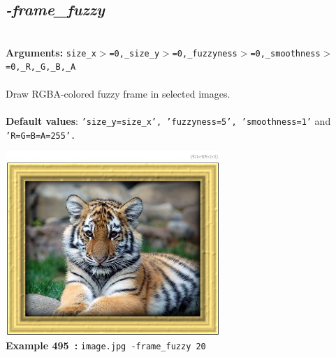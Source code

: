 \documentclass[a4paper,11pt,twoside]{book}
\begin{document}
\subsection{\emph{-frame\_fuzzy} }\vspace*{-0.5em}
~\\\textbf{Arguments: } 
{\small \texttt{size\_x$>$=0,\_size\_y$>$=0,\_fuzzyness$>$=0,\_smoothness$>$=0,\_R,\_G,\_B,\_A}}\\~\\
Draw RGBA-colored fuzzy frame in selected images.
~\\~\\\textbf{Default values}: {\small \texttt{'size\_y=size\_x', 'fuzzyness=5', 'smoothness=1'} and \texttt{'R=G=B=A=255'.}}
\begin{center}\includegraphics[keepaspectratio=true,height=7cm,width=\textwidth]{img/gmic_def495.jpg}\\
{\footnotesize \textbf{Example 495~:} \texttt{image.jpg -frame\_fuzzy 20}}
\end{center}
\end{document}
